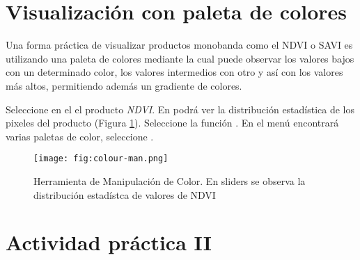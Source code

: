 \section{Visualización con paleta de colores}

Una forma práctica de visualizar productos monobanda como el NDVI o SAVI es utilizando una paleta de colores mediante la cual puede observar los valores bajos con un determinado color, los valores intermedios con otro y así con los valores más altos, permitiendo además un gradiente de colores. %

Seleccione en el  el producto \emph{NDVI}. En  podrá ver la distribución estadística de los pixeles del producto (Figura \ref{fig:color-man}). Seleccione la función . En el menú encontrará varias paletas de color, seleccione  . 

\begin{figure}[h!]
    \centering
    \texttt{[image: fig:colour-man.png]}
    \caption{Herramienta de Manipulación de Color. En sliders se observa la distribución estadístca de valores de NDVI}
    \label{fig:color-man}
\end{figure}


\section{Actividad práctica II}



